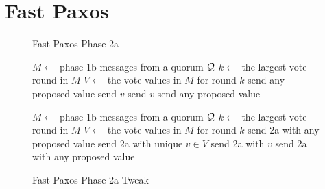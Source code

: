 \section{Fast Paxos}
\begin{figure}[ht]
  \begin{minipage}[t]{0.48\textwidth}
    \begin{algorithm}[H]
      \caption{Fast Paxos Phase 2a}%
      \begin{algorithmic}[1]
        \State $M \gets$ phase 1b messages from a quorum $\mathcal{Q}$
        \State $k \gets$ the largest vote round in $M$
        \State $V \gets$ the vote values in $M$ for round $k$
          \State send any proposed value 
          \State send $v$ 
          \State send $v$ 
        \Else{}
          \State send any proposed value 
        \EndIf{}
      \end{algorithmic}
    \end{algorithm}
  \end{minipage}%
  \hspace{0.04\textwidth}%
  \begin{minipage}[t]{0.48\textwidth}
    \begin{algorithm}[H]
      \caption{Fast Paxos Phase 2a Tweak}%
      \begin{algorithmic}[1]
        \State $M \gets$ phase 1b messages from a quorum $\mathcal{Q}$
        \State $k \gets$ the largest vote round in $M$
        \State $V \gets$ the vote values in $M$ for round $k$
          \State send 2a with any proposed value 
          \State send 2a with unique $v \in V$ 
          \State send 2a with $v$ 
        \Else{}
          \State send 2a with any proposed value 
        \EndIf{}
      \end{algorithmic}
    \end{algorithm}
  \end{minipage}
\end{figure}

